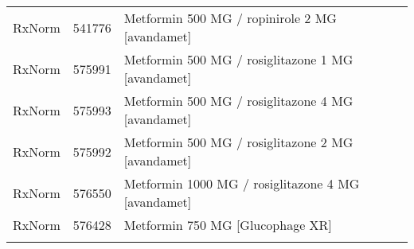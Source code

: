 \begin{longtable}{p{}p{}p{}}
  RxNorm & 541776 & Metformin 500 MG / ropinirole 2 MG [avandamet] \\ 
  RxNorm & 575991 & Metformin 500 MG / rosiglitazone 1 MG [avandamet] \\ 
  RxNorm & 575993 & Metformin 500 MG / rosiglitazone 4 MG [avandamet] \\ 
  RxNorm & 575992 & Metformin 500 MG / rosiglitazone 2 MG [avandamet] \\ 
  RxNorm & 576550 & Metformin 1000 MG / rosiglitazone 4 MG [avandamet] \\ 
  RxNorm & 576428 & Metformin 750 MG [Glucophage XR] \\ 
  \hline
\label{tab:codes_metformin}
\end{longtable}
